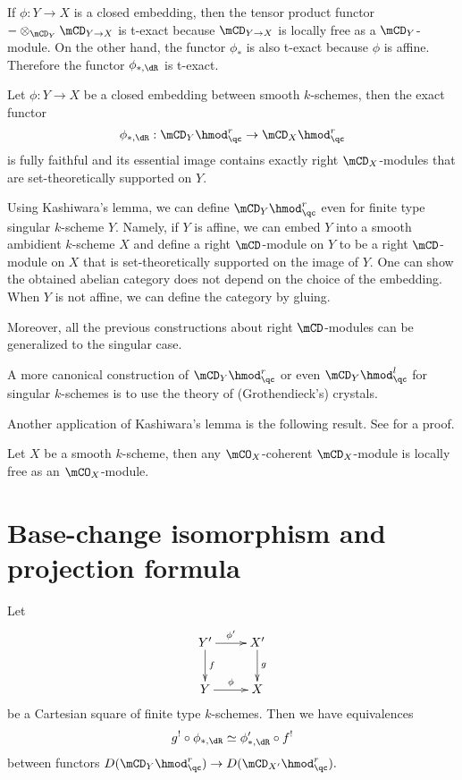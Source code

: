 	If $\phi:Y\to X$ is a closed embedding, then the tensor product functor $-\ot_{\mCD_Y} \mCD_{Y\to X}$ is t-exact because $\mCD_{Y\to X}$ is locally free as a $\mCD_Y$-module. On the other hand, the functor $\phi_*$ is also t-exact because $\phi$ is affine. Therefore the functor $\phi_{*,\dR} $ is t-exact. 

	\begin{thm}
		Let $\phi:Y \to X$ be a closed embedding between smooth $k$-schemes, then the exact functor
		\[
			\phi_{*,\dR}:  \mCD_Y\hmod_\qc^r  \to  \mCD_X\hmod_\qc^r
		\]
		is fully faithful and its essential image contains exactly right $\mCD_X$-modules that are set-theoretically supported on $Y$.
	\end{thm}


	

	\begin{rem}
		Using Kashiwara's lemma, we can define $\mCD_Y\hmod_\qc^r$ even for finite type singular $k$-scheme $Y$. Namely, if $Y$ is affine, we can embed $Y$ into a smooth ambidient $k$-scheme $X$ and define a right $\mCD$-module on $Y$ to be a right $\mCD$-module on $X$ that is set-theoretically supported on the image of $Y$. One can show the obtained abelian category does not depend on the choice of the embedding. When $Y$ is not affine, we can define the category by gluing.

		Moreover, all the previous constructions about right $\mCD$-modules can be generalized to the singular case.

		A more canonical construction of $\mCD_Y\hmod_\qc^r$ or even $\mCD_Y\hmod_\qc^l$ for singular $k$-schemes is to use the theory of (Grothendieck's) crystals.
	\end{rem}

	Another application of Kashiwara's lemma is the following result. See \cite[Sect. 5.12]{G} for a proof.

	\begin{cor}
		Let $X$ be a smooth $k$-scheme, then any $\mCO_X$-coherent $\mCD_X$-module is locally free as an $\mCO_X$-module.
	\end{cor}

\section{Base-change isomorphism and projection formula}
	\begin{facts}
		Let
		\[
			\xymatrix{
				Y' \ar[r]^-{\phi'} \ar[d]^-f & X' \ar[d]^-g \\
				Y \ar[r]^-\phi & X
			}
		\]
		be a Cartesian square of finite type $k$-schemes. Then we have equivalences
		\[
			g^!\circ \phi_{*,\dR} \simeq \phi'_{*,\dR}\circ f^!
		\]
		between functors $D( \mCD_Y\hmod_\qc^r ) \to D( \mCD_{X'}\hmod_\qc^r ). $
	\end{facts}

